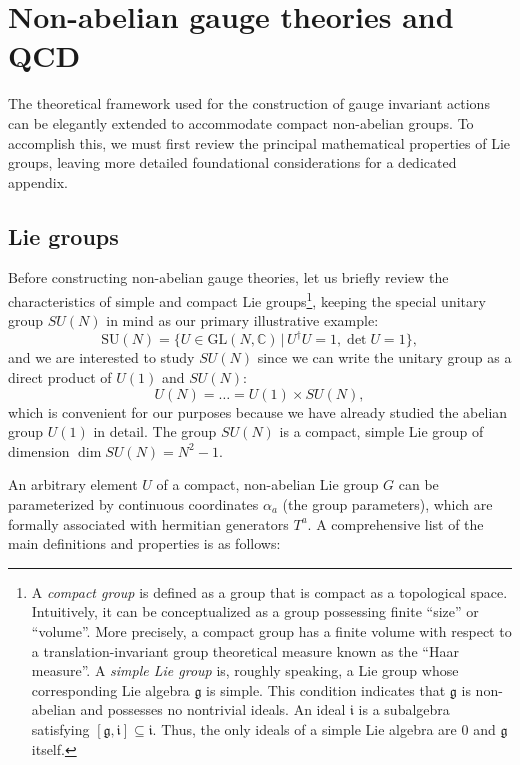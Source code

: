 \section{Non-abelian gauge theories and QCD}

The theoretical framework used for the construction of gauge invariant actions can be elegantly extended to accommodate compact non-abelian groups. To accomplish this, we must first review the principal mathematical properties of Lie groups, leaving more detailed foundational considerations for a dedicated appendix.

\subsection{Lie groups}

Before constructing non-abelian gauge theories, let us briefly review the characteristics of simple and compact Lie groups\footnote{A \textit{compact group} is defined as a group that is compact as a topological space. Intuitively, it can be conceptualized as a group possessing finite ``size'' or ``volume''. More precisely, a compact group has a finite volume with respect to a translation-invariant group theoretical measure known as the ``Haar measure''. A \textit{simple Lie group} is, roughly speaking, a Lie group whose corresponding Lie algebra \(\mathfrak{g}\) is simple. This condition indicates that \(\mathfrak{g}\) is non-abelian and possesses no nontrivial ideals. An ideal \(\mathfrak{i}\) is a subalgebra satisfying \([\mathfrak{g}, \mathfrak{i}] \subseteq \mathfrak{i}\). Thus, the only ideals of a simple Lie algebra are \(0\) and \(\mathfrak{g}\) itself.}, keeping the special unitary group \(SU(N)\) in mind as our primary illustrative example:
\[
    \mathrm{SU}(N) = \{U \in \mathrm{GL}(N, \mathbb{C}) \, | \, U^\dagger U = 1, \det U = 1\},
\]
and we are interested to study \(SU(N)\) since we can write the unitary group as a direct product of \(U(1)\) and \(SU(N)\):
\[
    U(N) = \dots = U(1) \times SU(N) ,
\]
which is convenient for our purposes because we have already studied the abelian group \(U(1)\) in detail. The group \(SU(N)\) is a compact, simple Lie group of dimension \(\dim SU(N) = N^2 - 1\).

An arbitrary element \(U\) of a compact, non-abelian Lie group \(G\) can be parameterized by continuous coordinates \(\alpha_a\) (the group parameters), which are formally associated with hermitian generators \(T^a\). A comprehensive list of the main definitions and properties is as follows:


